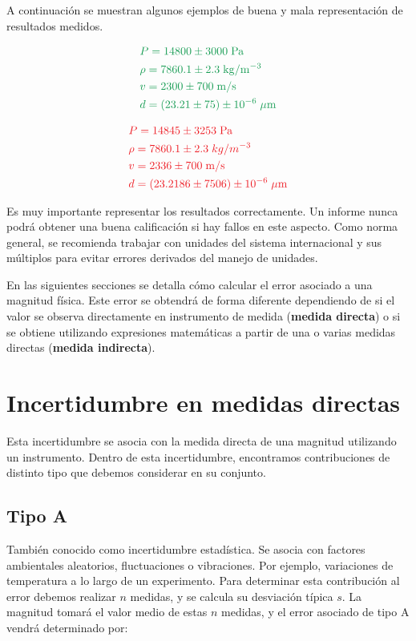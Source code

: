 \documentclass{book}
\begin{document}
A continuación se muestran algunos ejemplos de buena y mala representación de resultados medidos.

\begin{equation}
  \begin{aligned}
    & \color{ForestGreen} P = 14800 \pm 3000 \; \mathrm{Pa} \\
    & \color{ForestGreen} \rho = 7860.1 \pm 2.3 \; \mathrm{kg / m^{-3}} \\
    & \color{ForestGreen} v = 2300 \pm 700 \; \mathrm{m/s} \\
    & \color {ForestGreen} d = ( 23.21 \pm 75 ) \pm 10^{-6} \; \mathrm{\mu m}
  \end{aligned}
\end{equation}

\begin{equation}
  \begin{aligned}
    & \color{Red} P = 14845 \pm 3253 \; \mathrm{Pa} \\
    & \color{Red} \rho = 7860.1 \pm 2.3 \; kg / m^{-3} \\
    & \color{Red} v = 2336 \pm 700 \; \mathrm{m/s} \\
    & \color {Red} d = ( 23.2186 \pm 7506 ) \pm 10^{-6} \; \mathrm{\mu m}
  \end{aligned}
\end{equation}


Es muy importante representar los resultados correctamente. Un informe nunca podrá obtener una
buena calificación si hay fallos en este aspecto. Como norma general, se recomienda trabajar con
unidades del sistema internacional y sus múltiplos para evitar errores derivados del manejo de
unidades.

En las siguientes secciones se detalla cómo calcular el error asociado a una magnitud física. 
Este error se obtendrá de forma diferente dependiendo de si el valor se observa directamente en
instrumento de medida (\textbf{medida directa}) o si se obtiene utilizando expresiones matemáticas a partir
de una o varias medidas directas (\textbf{medida indirecta}).


\section{Incertidumbre en medidas directas}
Esta incertidumbre se asocia con la medida directa de una magnitud utilizando un instrumento.
Dentro de esta incertidumbre, encontramos contribuciones de distinto tipo que debemos considerar
en su conjunto.
\subsection{Tipo A}
También conocido como incertidumbre estadística. Se asocia con factores ambientales aleatorios, 
fluctuaciones o vibraciones. Por ejemplo, variaciones de temperatura a lo largo de un experimento.
Para determinar esta contribución al error debemos realizar $n$ medidas, y se calcula su desviación
típica $s$. La magnitud tomará el valor medio de estas $n$ medidas, y el error asociado de tipo A 
vendrá determinado por:
\end{document}
